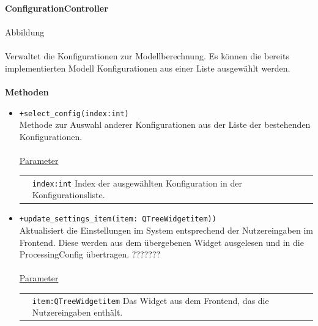 \documentclass{article}
\begin{document}
\begin{itemize}
\newpage
\textbf{\large{ConfigurationController}}\\\\Abbildung\\\\
Verwaltet die Konfigurationen zur Modellberechnung. Es können die bereits implementierten Modell Konfigurationen aus einer Liste ausgewählt werden. \\\\
\textbf{\large{Methoden}}
\begin{itemize}
\item \texttt{+select\_config(index:int)}\\ Methode zur Auswahl anderer Konfigurationen aus der Liste der bestehenden Konfigurationen.\\\\
\underline{{Parameter}}\\
\begin{tabular}{lp{10.7cm}}
 & \texttt{index:int} Index der ausgewählten Konfiguration in der Konfigurationsliste. \\
\end{tabular}
\item \texttt{+update\_settings\_item(item: QTreeWidgetitem))}\\ Aktualisiert die Einstellungen im System entsprechend der Nutzereingaben im Frontend. Diese werden aus dem übergebenen Widget ausgelesen und in die ProcessingConfig übertragen. ???????\\\\
\underline{{Parameter}}\\
\begin{tabular}{lp{10.7cm}}
 & \texttt{item:QTreeWidgetitem} Das Widget aus dem Frontend, das die Nutzereingaben enthält. \\
\end{tabular}
\end{itemize}



\end{itemize}
\end{document}

